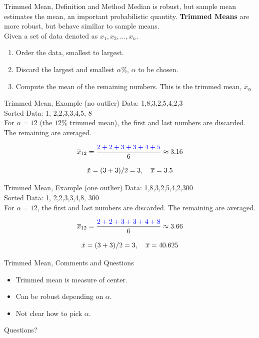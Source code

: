 \documentclass{beamer}
\newcommand{\blue}[1]{{\color{blue} #1}}
\newcommand{\red}[1]{{\color{red} #1}}
\newcommand{\qtns}[0]{\begin{center} Questions? \end{center}}
\newcommand{\nl}[1]{\vspace{#1 em}}
\begin{document}
\begin{frame}{Trimmed Mean, Definition and Method}
    Median is robust, but sample mean estimates the mean, an important probabilistic quantity. {\bf Trimmed Means} are more robust, but behave similiar to sample means.\\
    \nl{0.5}
    Given a set of data denoted as $x_1, x_2, \ldots, x_n$. \\
    \nl{0.5}
    \begin{enumerate}
        \item Order the data, smallest to largest.
        \item Discard the largest and smallest $\alpha \%$, $\alpha$ to be chosen.
        \item Compute the mean of the remaining numbers. This is the trimmed mean, $\overline{x}_\alpha$
    \end{enumerate}
\end{frame}

\begin{frame}{Trimmed Mean, Example (no outlier)}
    Data: 1,8,3,2,5,4,2,3\\
    \nl{0.5}
    Sorted Data: \red{1},\blue{2,2,3,3,4,5},\red{8}\\
    \nl{0.5}
    For $\alpha =12$ (the $12\%$ trimmed mean),  the \red{first} and \red{last} numbers are \red{discarded}. The \blue{remaining} are \blue{averaged}.

    \[\overline{x}_{12} = \frac{\blue{2+2+3+3+4+5}}{6} \approx 3.16\]

    \[\tilde{x} = (3+3)/2=3,\hskip 1em \overline{x} =3.5\]
\end{frame}

\begin{frame}{Trimmed Mean, Example (one outlier)}
    Data: 1,8,3,2,5,4,2,300\\
    \nl{0.5}
    Sorted Data: \red{1},\blue{2,2,3,3,4,8},\red{300}\\
    \nl{0.5}
    For $\alpha =12$,  the \red{first} and \red{last} numbers are \red{discarded}. The \blue{remaining} are \blue{averaged}.

    \[\overline{x}_{12} = \frac{\blue{2+2+3+3+4+8}}{6} \approx 3.66\]

    \[\tilde{x} = (3+3)/2=3,\hskip 1em \overline{x} = 40.625\]
\end{frame}

\begin{frame}{Trimmed Mean, Comments and Questions}
    \begin{itemize}
        \item Trimmed mean is measure of center.
        \item Can be robust depending on $\alpha$.
        \item Not clear how to pick $\alpha$.
    \end{itemize}
    \qtns
\end{frame}
\end{document}
